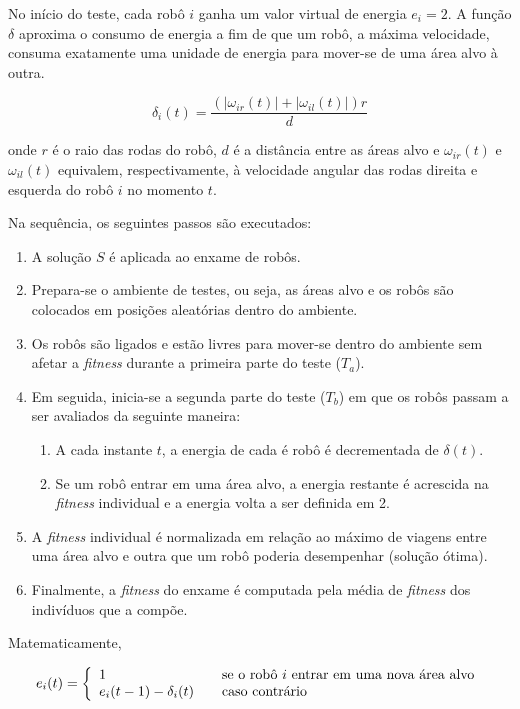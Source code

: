 No início do teste, cada robô $i$ ganha um valor virtual de energia $e_{i} = 2$. A função $\delta$ aproxima o consumo de energia a fim de que um robô, a máxima velocidade, consuma exatamente uma unidade de energia para mover-se de uma área alvo à outra.

$$
\delta_{i} (t) = \frac{( | \omega_{ir} (t) | + | \omega_{il} (t) |) r}{d}
$$

onde $r$ é o raio das rodas do robô, $d$ é a distância entre as áreas alvo e $\omega_{ir} (t)$ e $\omega_{il} (t)$ equivalem, respectivamente, à velocidade angular das rodas direita e esquerda do robô $i$ no momento $t$.

Na sequência, os seguintes passos são executados:

\begin{enumerate}
    \item A solução $S$ é aplicada ao enxame de robôs.
    \item Prepara-se o ambiente de testes, ou seja, as áreas alvo e os robôs são colocados em posições aleatórias dentro do ambiente.
    \item Os robôs são ligados e estão livres para mover-se dentro do ambiente sem afetar a \textit{fitness} durante a primeira parte do teste ($T_{a}$).
    \item Em seguida, inicia-se a segunda parte do teste ($T_{b}$) em que os robôs passam a ser avaliados da seguinte maneira:
    \begin{enumerate}
        \item A cada instante $t$, a energia de cada é robô é decrementada de $\delta (t)$.
        \item Se um robô entrar em uma área alvo, a energia restante é acrescida na \textit{fitness} individual e a energia volta a ser definida em 2.
    \end{enumerate}
    \item A \textit{fitness} individual é normalizada em relação ao máximo de viagens entre uma área alvo e outra que um robô poderia desempenhar (solução ótima).
    \item Finalmente, a \textit{fitness} do enxame é computada pela média de \textit{fitness} dos indivíduos que a compõe.
\end{enumerate}

Matematicamente,

$$
e_{i} (t) = \left\{
\begin{array}{l l}
1 & \quad \text{se o robô $i$ entrar em uma nova área alvo}\\
e_{i}(t - 1) - \delta_{i} (t) & \quad \text{caso contrário}
\end{array} \right.
$$

